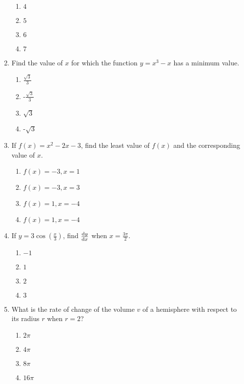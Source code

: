 \begin{multicols}{2}
\begin{enumerate}[label={\arabic*.}]
\begin{enumerate}[label={\Alph*.}]
            \item \(4\)
            \item \(5\)
            \item \(6\)
            \item \(7\)
        \end{enumerate}
  \item Find the value of \(x\) for which the function \(y = x^3 - x\) has a minimum value.
        \begin{enumerate}[label={\Alph*.}]
            \item \(\frac{\sqrt{3}}{3}\)
            \item -\(\frac{\sqrt{3}}{3}\)
            \item \(\sqrt{3}\)
            \item -\(\sqrt{3}\)
        \end{enumerate}
  \item If \(f(x) = x^2 - 2x - 3\), find the least value of \(f(x)\) and the corresponding value of \(x\).
        \begin{enumerate}[label={\Alph*.}]
            \item \(f(x) = -3, x = 1\)
            \item \(f(x) = -3, x = 3\)
            \item \(f(x) = 1, x = -4\)
            \item \(f(x) = 1, x = -4\)
        \end{enumerate}
  \item If \(y = 3 \cos\left(\frac{x}{3}\right)\), find \(\dv{y}{x}\) when \(x = \frac{3\pi}{2}\).
        \begin{enumerate}[label={\Alph*.}]
            \item \(-1\)
            \item \(1\)
            \item \(2\)
            \item  \(3\)
        \end{enumerate}
  \item What is the rate of change of the volume \(v\) of a hemisphere with respect to its radius \(r\) when \(r = 2\)?
        \begin{enumerate}[label={\Alph*.}]
            \item  \(2\pi\)
            \item  \(4\pi\)
            \item  \(8\pi\)
            \item  \(16\pi\)
        \end{enumerate}

\end{enumerate}
\end{multicols}
